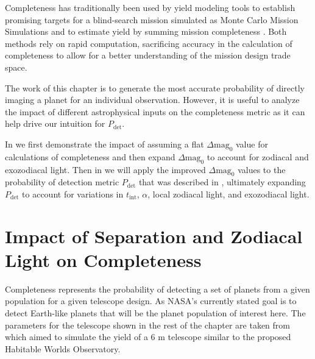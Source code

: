 Completeness has traditionally been used by yield modeling tools to establish
promising targets for a blind-search mission simulated as Monte Carlo
Mission Simulations \citep{savranskyEXOSIMSExoplanetOpenSource2017}
and to estimate yield by summing mission completeness
\citep{Brown2005d}. Both
methods rely on rapid computation, sacrificing accuracy in the calculation of
completeness to allow for a better understanding of the mission design trade
space.

The work of this chapter is to generate the most accurate probability of
directly imaging a planet for an individual observation. However, it is useful
to analyze the impact of different astrophysical inputs on the completeness
metric as it can help drive our intuition for $P_\textrm{det}$.

In  we first demonstrate the impact of
assuming a flat $\Delta\textrm{mag}_0$ value for calculations of completeness
and then expand $\Delta\textrm{mag}_0$ to account for zodiacal and exozodiacal light. Then in
 we will apply the improved $\Delta\textrm{mag}_0$ values to the probability of
detection metric $P_\textrm{det}$ that was described in ,
ultimately expanding $P_\textrm{det}$ to account for variations in $t_\textrm{int}$, $\alpha$,
local zodiacal light, and exozodiacal light.


\section{Impact of Separation and Zodiacal Light on Completeness}
\label{sec:impact_on_completeness}

Completeness represents the probability of detecting a set of planets from a
given population for a given telescope design. As NASA's currently stated goal
is to detect Earth-like planets \citep{nasaNASAStrategic2022} that will be the planet population of interest
here. The parameters for the telescope shown in the rest of the chapter are
taken from \citet{morganExplorationExpectedNumber2022a} which aimed to simulate
the yield of a 6 m telescope similar to the proposed Habitable Worlds
Observatory.

